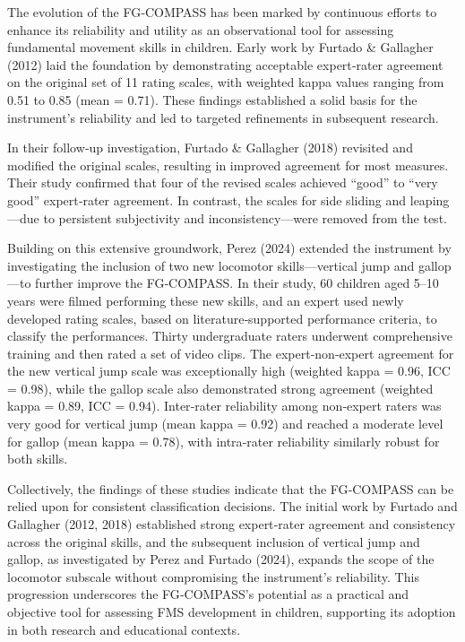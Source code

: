 \documentclass[
  letterpaper,
  DIV=11,
  numbers=noendperiod]{scrreprt}
\begin{document}
The evolution of the FG‑COMPASS has been marked by continuous efforts to
enhance its reliability and utility as an observational tool for
assessing fundamental movement skills in children. Early work by Furtado
\& Gallagher (2012) laid the foundation by demonstrating acceptable
expert‑rater agreement on the original set of 11 rating scales, with
weighted kappa values ranging from 0.51 to 0.85 (mean = 0.71). These
findings established a solid basis for the instrument's reliability and
led to targeted refinements in subsequent research.

In their follow‑up investigation, Furtado \& Gallagher (2018) revisited
and modified the original scales, resulting in improved agreement for
most measures. Their study confirmed that four of the revised scales
achieved ``good'' to ``very good'' expert‑rater agreement. In contrast,
the scales for side sliding and leaping---due to persistent subjectivity
and inconsistency---were removed from the test.

Building on this extensive groundwork, Perez (2024) extended the
instrument by investigating the inclusion of two new locomotor
skills---vertical jump and gallop---to further improve the FG‑COMPASS.
In their study, 60 children aged 5--10 years were filmed performing
these new skills, and an expert used newly developed rating scales,
based on literature‑supported performance criteria, to classify the
performances. Thirty undergraduate raters underwent comprehensive
training and then rated a set of video clips. The expert‑non‑expert
agreement for the new vertical jump scale was exceptionally high
(weighted kappa = 0.96, ICC = 0.98), while the gallop scale also
demonstrated strong agreement (weighted kappa = 0.89, ICC = 0.94).
Inter‑rater reliability among non‑expert raters was very good for
vertical jump (mean kappa = 0.92) and reached a moderate level for
gallop (mean kappa = 0.78), with intra‑rater reliability similarly
robust for both skills.

Collectively, the findings of these studies indicate that the FG‑COMPASS
can be relied upon for consistent classification decisions. The initial
work by Furtado and Gallagher (2012, 2018) established strong
expert‑rater agreement and consistency across the original skills, and
the subsequent inclusion of vertical jump and gallop, as investigated by
Perez and Furtado (2024), expands the scope of the locomotor subscale
without compromising the instrument's reliability. This progression
underscores the FG‑COMPASS's potential as a practical and objective tool
for assessing FMS development in children, supporting its adoption in
both research and educational contexts.
\end{document}
